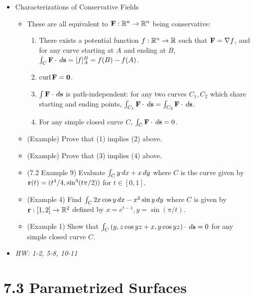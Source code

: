 \documentclass[11pt]{article}
\begin{document}
\begin{itemize}
  \item Characterizations of Conservative Fields
    \begin{itemize}
      \item These are all equivalent to \(\mathbf{F}:\mathbb R^n\to\mathbb R^n\)
        being conservative:
        \begin{enumerate}[(1)]
          \item There exists a potential function \(f:\mathbb R^n\to\mathbb R\) such
            that \(\mathbf{F}=\nabla f\), and
            for any curve starting at \(A\) and ending at \(B\),
            \(\int_C\mathbf{F}\cdot\,d\mathbf{s}=[f]_A^B=f(B)-f(A)\).
          \item \(\textrm{curl}\, \mathbf{F}=\mathbf{0}\).
          \item \(\int \mathbf{F}\cdot\,d\mathbf{s}\)
            is path-independent: for any two curves \(C_1,C_2\)
            which share starting and ending points,
            \(
              \int_{C_1}\mathbf{F}\cdot\,d\mathbf{s}
                =
              \int_{C_2}\mathbf{F}\cdot\,d\mathbf{s}
            \).
          \item For any simple closed curve \(C\),
            \(\int_C\mathbf{F}\cdot\,d\mathbf{s}=0\).
        \end{enumerate}
      \item (Example) Prove that (1) implies (2) above.
      \item (Example) Prove that (3) implies (4) above.
      \item (7.2 Example 9) Evaluate \(\int_C y\,d x+x\,d y\) where
        \(C\) is the curve given by \(\mathbf{r}(t)=(t^4/4,\sin^3(t\pi/2))\)
        for \(t\in[0,1]\).
      \item (Example 4) Find \(\int_C 2x\cos y\,d x-x^2\sin y\,d y\)
        where \(C\) is given by \(\mathbf{r}:[1,2]\to\mathbb R^2\) defined by
        \(x=e^{t-1},y=\sin(\pi/t)\).
      \item (Example 1) Show that
        \(\int_C \left(y,z\cos yz+x,y\cos yz\right)\cdot\,d\mathbf{s}=0\) for any
        simple closed curve \(C\).
    \end{itemize}
  \item\textit{
    HW: 1-2, 5-8, 10-11
  }
\end{itemize}



\section*{7.3 Parametrized Surfaces}
\end{document}
